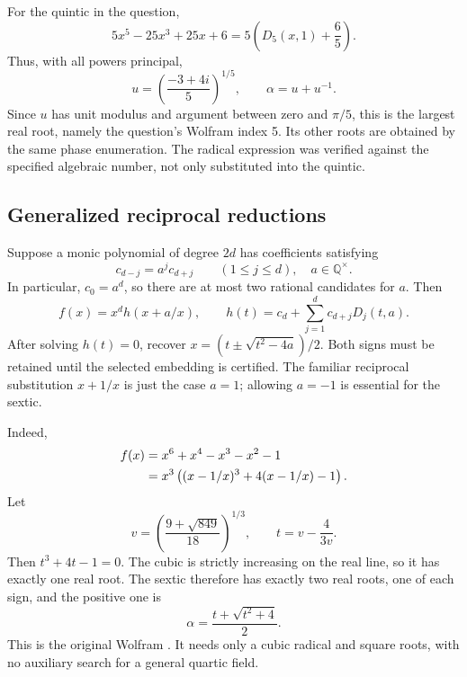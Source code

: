 \documentclass[11pt,letterpaper]{article}
\theoremstyle{definition}\newtheorem{definition}[theorem]{Definition}
\theoremstyle{remark}\newtheorem{remark}[theorem]{Remark}
\newcommand{\Q}{\mathbb Q}\newcommand{\C}{\mathbb C}\newcommand{\Z}{\mathbb Z}
\begin{document}
For the quintic in the question,
\[
 5x^5-25x^3+25x+6=5\left(D_5(x,1)+\frac65\right).
\]
Thus, with all powers principal,
\begin{equation}
 u=\left(\frac{-3+4i}{5}\right)^{1/5},\qquad
 \boxed{\alpha=u+u^{-1}}.\label{eq:quintic}
\end{equation}
Since \(u\) has unit modulus and argument between zero and \(\pi/5\), this is
the largest real root, namely the question's Wolfram index 5. Its other roots
are obtained by the same phase enumeration. The radical expression was
verified against the specified algebraic number, not only substituted into
the quintic.

\subsection{Generalized reciprocal reductions}
Suppose a monic polynomial of degree \(2d\) has coefficients satisfying
\[
 c_{d-j}=a^j c_{d+j}\qquad(1\leq j\leq d),\quad a\in\Q^\times.
\]
In particular, \(c_0=a^d\), so there are at most two rational candidates for
\(a\). Then
\begin{equation}
 f(x)=x^d h(x+a/x),\qquad
 h(t)=c_d+\sum_{j=1}^d c_{d+j}D_j(t,a).\label{eq:reciprocal}
\end{equation}
After solving \(h(t)=0\), recover
\(x=(t\pm\sqrt{t^2-4a})/2\). Both signs must be retained until the selected
embedding is certified. The familiar reciprocal substitution \(x+1/x\)
is just the case \(a=1\); allowing \(a=-1\) is essential for the sextic.

Indeed,
\begin{align}
 f(x)&=x^6+x^4-x^3-x^2-1\notag\\
 &=x^3\left((x-1/x)^3+4(x-1/x)-1\right).\label{eq:sexticreduce}
\end{align}
Let
\begin{equation}
 v=\left(\frac{9+\sqrt{849}}{18}\right)^{1/3},\qquad
 t=v-\frac{4}{3v}.
\end{equation}
Then \(t^3+4t-1=0\). The cubic is strictly increasing on the real line,
so it has exactly one real root. The sextic therefore has exactly two real
roots, one of each sign, and the positive one is
\begin{equation}
 \boxed{\alpha=\frac{t+\sqrt{t^2+4}}2}.\label{eq:sextic}
\end{equation}
This is the original Wolfram . It needs only a cubic radical
and square roots, with no auxiliary search for a general quartic field.
\end{document}
